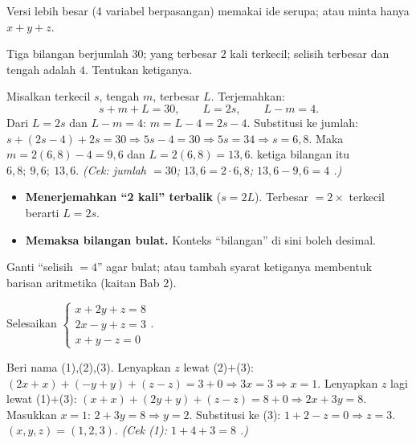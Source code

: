 \begin{variasi}
Versi lebih besar (4 variabel berpasangan) memakai ide serupa; atau minta hanya
$x+y+z$.
\end{variasi}

\begin{soalbox}{}
Tiga bilangan berjumlah $30$; yang terbesar $2$ kali terkecil; selisih terbesar
dan tengah adalah $4$. Tentukan ketiganya.
\end{soalbox}

\jawab
{} Misalkan terkecil $s$, tengah $m$, terbesar $L$. Terjemahkan:
\[
s+m+L=30,\qquad L=2s,\qquad L-m=4.
\]
 Dari $L=2s$ dan $L-m=4$: $m=L-4=2s-4$.
 Substitusi ke jumlah: $s+(2s-4)+2s=30\Rightarrow 5s-4=30\Rightarrow
5s=34\Rightarrow s=6{,}8$.
 Maka $m=2(6{,}8)-4=9{,}6$ dan $L=2(6{,}8)=13{,}6$.
\jadi ketiga bilangan itu $6{,}8;\ 9{,}6;\ 13{,}6$.
\emph{(Cek: jumlah $=30$; $13{,}6=2\cdot6{,}8$; $13{,}6-9{,}6=4$ \checkmark.)}

\begin{jebakan}
\begin{itemize}[leftmargin=*,topsep=2pt]
  \item \textbf{Menerjemahkan ``2 kali'' terbalik} ($s=2L$). Terbesar $=2\times$
  terkecil berarti $L=2s$.
  \item \textbf{Memaksa bilangan bulat.} Konteks ``bilangan'' di sini boleh
  desimal.
\end{itemize}
\end{jebakan}

\begin{variasi}
Ganti ``selisih $=4$'' agar bulat; atau tambah syarat ketiganya membentuk
barisan aritmetika (kaitan Bab 2).
\end{variasi}

\begin{soalbox}{}
Selesaikan $\begin{cases} x+2y+z=8\\ 2x-y+z=3\\ x+y-z=0\end{cases}$.
\end{soalbox}

\jawab
{} Beri nama (1),(2),(3). Lenyapkan $z$ lewat (2)$+$(3):
$(2x+x)+(-y+y)+(z-z)=3+0\Rightarrow 3x=3\Rightarrow x=1$.
 Lenyapkan $z$ lagi lewat (1)$+$(3): $(x+x)+(2y+y)+(z-z)=8+0\Rightarrow
2x+3y=8$. Masukkan $x=1$: $2+3y=8\Rightarrow y=2$.
 Substitusi ke (3): $1+2-z=0\Rightarrow z=3$.
\jadi $(x,y,z)=(1,2,3)$.
\emph{(Cek (1): $1+4+3=8$ \checkmark.)}

